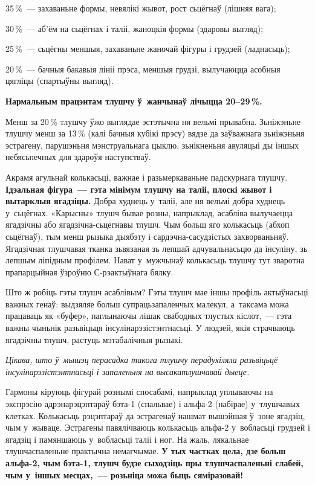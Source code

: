 35\,\%~--- захаваньне формы, невялікі жывот, рост сьцёгнаў (лішняя вага);

30\,\%~--- аб'ём на сьцёгнах і таліі, жаноцкія формы (здаровы выгляд);

25\,\%~--- сьцёгны меншыя, захаваньне жаночай фігуры і грудзей (ладнасьць);

20\,\%~--- бачныя бакавыя лініі прэса, меншыя грудзі, вылучаюцца асобныя цягліцы (спартыўны выгляд).

\textbf{Нармальным працэнтам тлушчу ў~жанчынаў лічыцца 20--29\,\%.}

Менш за 20\,\% тлушчу ўжо выглядае эстэтычна ня вельмі прывабна. Зьніжэньне тлушчу менш за 13\,\% (калі бачныя кубікі прэсу) вядзе да заўважнага зьніжэньня эстрагену, парушэньня мэнструальнага цыклю, зьнікненьня авуляцыі ды іншых небясьпечных для здароўя наступстваў.

Акрамя агульнай колькасьці, важнае і разьмеркаваньне падскурнага тлушчу. \textbf{Ідэальная фігура~--- гэта мінімум тлушчу на таліі, плоскі жывот і вытарклыя ягадзіцы.} Добра худнець у~таліі, але ня вельмі добра худнець у~сьцёгнах. «Карысны» тлушч бывае розны, напрыклад, асабліва вылучаецца ягадзічны або ягадзічна-сьцегнавы тлушч. Чым больш яго колькасьць (абхоп сьцёгнаў), тым менш рызыка дыябэту і сардэчна-сасудзістых захворваньняў. Ягадзічная тлушчавая тканка зьвязаная зь лепшай адчувальнасьцю да інсуліну, зь лепшым ліпідным профілем. Нават у~мужчынаў колькасьць тлушчу тут зваротна прапарцыйная ўзроўню С-рэактыўнага бялку.

Што ж робіць гэты тлушч асаблівым? Гэты тлушч мае іншы профіль актыўнасьці важных генаў: выдзяляе больш супрацьзапаленчых малекул, а~таксама можа працаваць як «буфер», паглынаючы лішак свабодных тлустых кіслот,~--- гэта важны чыньнік разьвіцьця інсулінарэзістэнтнасьці. У людзей, якія страчваюць ягадзічны тлушч, растуць мэтабалічныя рызыкі. 

\emph{Цікава, што ў~мышэц перасадка такога тлушчу перадухіляла разьвіцьцё інсулінарэзістэнтнасьці і запаленьня на высакатлушчавай дыеце.}

Гармоны кіруюць фігурай рознымі спосабамі, напрыклад уплываючы на экспрэсію адрэнарэцэптараў бэта-1 (спальвае) і альфа-2 (набірае) у~тлушчавых клетках. Колькасьць рэцэптараў да эстрагенаў нашмат вышэйшая ў~зоне ягадзіц, чым у~жываце. Эстрагены павялічваюць колькасьць альфа-2 у~вобласьці грудзей і ягадзіц і памяншаюць у~вобласьці таліі і ног. На жаль, лякальнае тлушчаспаленьне практычна немагчымае. \textbf{У тых частках цела, дзе больш альфа-2, чым бэта-1, тлушч будзе сыходзіць пры тлушчаспаленьні слабей, чым у~іншых месцах,~--- розьніца можа быць сяміразовай!}

